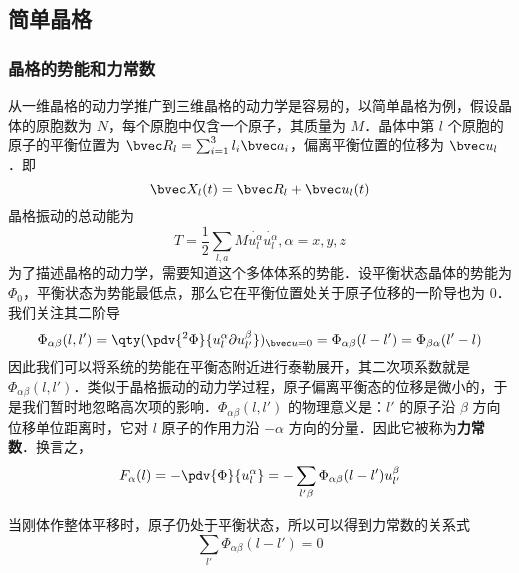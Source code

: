 
\subsection{简单晶格}
\subsubsection{晶格的势能和力常数}
从一维晶格的动力学推广到三维晶格的动力学是容易的，以简单晶格为例，假设晶体的原胞数为 $N$，每个原胞中仅含一个原子，其质量为 $M$．晶体中第 $l$ 个原胞的原子的平衡位置为 $\bvec R_l=\sum_{i=1}^3 l_i\bvec a_i$，偏离平衡位置的位移为 $\bvec u_l$．即
\begin{equation}
\bvec X_l(t)=\bvec R_l+\bvec u_l(t)
\end{equation}
晶格振动的总动能为
\begin{equation}
T=\frac{1}{2}\sum_{l,a} M \dot{u_l^\alpha}\dot{u_l^\alpha},\alpha=x,y,z
\end{equation}
为了描述晶格的动力学，需要知道这个多体体系的势能．设平衡状态晶体的势能为 $\Phi_0$，平衡状态为势能最低点，那么它在平衡位置处关于原子位移的一阶导也为 $0$．我们关注其二阶导
\begin{equation}
\Phi_{\alpha\beta}(l,l')=\qty(\pdv{^2\Phi}{u_l^\alpha\partial u_{l'}^\beta})_{\bvec u=0}=\Phi_{\alpha\beta}(l-l')=\Phi_{\beta\alpha}(l'-l)
\end{equation}
因此我们可以将系统的势能在平衡态附近进行泰勒展开，其二次项系数就是 $\Phi_{\alpha\beta}(l,l')$．类似于晶格振动的动力学过程，原子偏离平衡态的位移是微小的，于是我们暂时地忽略高次项的影响．$\Phi_{\alpha\beta}(l,l')$ 的物理意义是：$l'$ 的原子沿 $\beta$ 方向位移单位距离时，它对 $l$ 原子的作用力沿 $-\alpha$ 方向的分量．因此它被称为\textbf{力常数}．换言之，
\begin{equation}\label{latdyn_eq1}
F_\alpha(l)=-\pdv{\Phi}{u_l^\alpha}=-\sum_{l'\beta}\Phi_{\alpha\beta}(l-l')u_{l'}^\beta
\end{equation}

当刚体作整体平移时，原子仍处于平衡状态，所以可以得到力常数的关系式
\begin{equation}
\sum_{l'}\Phi_{\alpha\beta}(l-l')=0
\end{equation}

